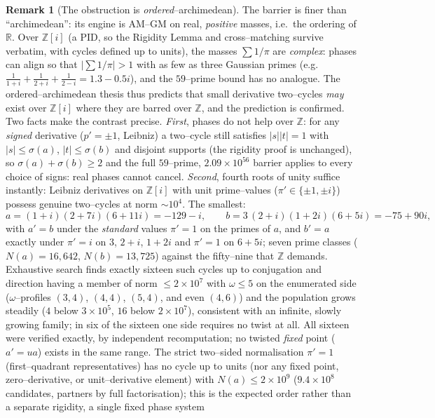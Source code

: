 \documentclass[11pt]{article}
\theoremstyle{definition}
\newtheorem{remark}[theorem]{Remark}
\begin{document}
\begin{remark}[The obstruction is \emph{ordered}--archimedean]\label{rem:ordered}
The barrier is finer than ``archimedean'': its engine is AM--GM on real, \emph{positive} masses, i.e.\
the ordering of $\mathbb{R}$. Over $\mathbb{Z}[i]$ (a PID, so the Rigidity Lemma and cross--matching
survive verbatim, with cycles defined up to units), the masses $\sum1/\pi$ are \emph{complex}: phases can
align so that $\bigl|\sum1/\pi\bigr|>1$ with as few as three Gaussian primes (e.g.\
$\tfrac1{1+i}+\tfrac1{2+i}+\tfrac1{2-i}=1.3-0.5i$), and the $59$--prime bound has no analogue. The
ordered--archimedean thesis thus predicts that small derivative two--cycles \emph{may} exist over
$\mathbb{Z}[i]$ where they are barred over $\mathbb{Z}$, and the prediction is confirmed. Two facts
make the contrast precise.
\emph{First}, phases do not help over $\mathbb{Z}$: for any \emph{signed} derivative ($p'=\pm1$, Leibniz)
a two--cycle still satisfies $|s||t|=1$ with $|s|\le\sigma(a)$, $|t|\le\sigma(b)$ and disjoint supports
(the rigidity proof is unchanged), so $\sigma(a)+\sigma(b)\ge2$ and the full $59$--prime,
$2.09\times10^{56}$ barrier applies to every choice of signs: real phases cannot cancel.
\emph{Second}, fourth roots of unity suffice instantly: Leibniz derivatives on $\mathbb{Z}[i]$ with unit
prime--values ($\pi'\in\{\pm1,\pm i\}$) possess genuine two--cycles at norm ${\sim}10^4$. The smallest:
\[ a=(1+i)(2+7i)(6+11i)=-129-i,\qquad b=3\,(2+i)(1+2i)(6+5i)=-75+90i, \]
with $a'=b$ under the \emph{standard} values $\pi'=1$ on the primes of $a$, and $b'=a$ exactly under
$\pi'=i$ on $3$, $2+i$, $1+2i$ and $\pi'=1$ on $6+5i$; seven prime classes
($N(a)=16{,}642$, $N(b)=13{,}725$) against the fifty--nine that $\mathbb{Z}$ demands. Exhaustive search
finds exactly sixteen such cycles up to conjugation and direction having a member of norm
$\le2\times10^7$ with $\omega\le5$ on the enumerated side ($\omega$--profiles $(3,4)$, $(4,4)$,
$(5,4)$, and even $(4,6)$) and the population grows steadily ($4$ below $3\times10^5$, $16$ below
$2\times10^7$), consistent with an infinite, slowly growing family; in six of the sixteen one side
requires no twist at all. All sixteen were verified exactly, by independent recomputation; no twisted
\emph{fixed} point ($a'=ua$) exists in the same range. The strict two--sided normalisation $\pi'=1$
(first--quadrant representatives) has no cycle up to units (nor any fixed point, zero--derivative, or
unit--derivative element) with $N(a)\le2\times10^9$ ($9.4\times10^8$ candidates, partners by full
factorisation); this is the expected order rather than a separate rigidity, a single fixed phase system

\end{remark}
\end{document}
